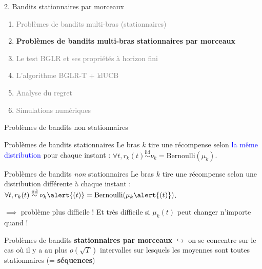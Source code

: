 \documentclass[11pt,french,ignorenonframetext,]{beamer}
\begin{document}
\begin{frame}{2. Bandits stationnaires par morceaux}

  \begin{enumerate}
    \item
    \textcolor{gray}{
      Problèmes de bandits multi-bras (stationnaires)
    }
    \vspace*{15pt}

    \item
    \alert{\textbf{%
      Problèmes de bandits multi-bras stationnaires par morceaux
    }}
    \vspace*{15pt}

    \item
    \textcolor{gray}{
      Le test BGLR et ses propriétés à horizon fini
    }
    \vspace*{15pt}

    \item
    \textcolor{gray}{
      L'algorithme BGLR-T + klUCB
    }
    \vspace*{15pt}

    \item
    \textcolor{gray}{
      Analyse du regret
    }
    \vspace*{15pt}

    \item
    \textcolor{gray}{
      Simulations numériques
    }
  \end{enumerate}

\end{frame}


\begin{frame}{Problèmes de bandits non stationnaires}

  \begin{block}{Problèmes de bandits stationnaires}
    Le bras $k$ tire une récompense selon \textcolor{blue}{la même distribution} pour chaque instant :
    $\forall t, r_k(t) \overset{\text{iid}}{\sim} \nu_k = \mathrm{Bernoulli}(\mu_k)$.
  \end{block}

  \pause
  \begin{alertblock}{Problèmes de bandits \emph{non} stationnaires}
    Le bras $k$ tire une récompense selon \alert{une distribution différente à chaque instant} :
    $\forall t, r_k(t) \overset{\text{iid}}{\sim} \nu_k\alert{(t)} = \mathrm{Bernoulli}(\mu_k\alert{(t)})$.
  \end{alertblock}

  $\implies$ \dXey{} problème plus difficile !
  Et très difficile si $\mu_k(t)$ peut changer n'importe quand !

  \pause
  \begin{block}{Problèmes de bandits \textbf{stationnaires par morceaux}}
    $\hookrightarrow$ on se concentre sur le cas où il y a au plus $o(\sqrt{T})$ intervalles sur lesquels les moyennes sont toutes stationnaires (= \textbf{séquences})
  \end{block}
\end{frame}
\end{document}
